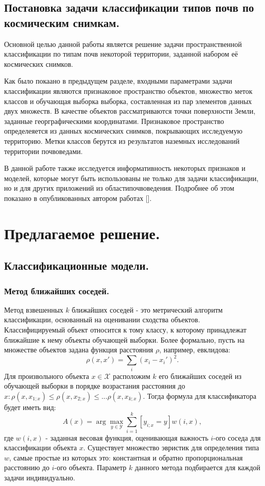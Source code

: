 \documentclass[12pt]{article}
\begin{document}
\subsection{Постановка задачи классификации типов почв по космическим снимкам.}

\par
Основной целью данной работы является решение задачи пространственной классификации
по типам почв некоторой территории, заданной набором её космических снимков.
\par
Как было покаано в предыдущем разделе, входными параметрами задачи классификации являются
признаковое пространство объектов, множество меток классов и обучающая выборка выборка,
составленная из пар элементов данных двух множеств. В качестве объектов рассматриваются точки
поверхности Земли, заданные георграфическими координатами. Признаковое пространство определеяется
из данных космических снимков, покрывающих исследуемую территорию. Метки классов берутся
из результатов наземных исследований территории почвоведами.
\par
В данной работе также исследуется информативность некоторых признаков и моделей, 
которые могут быть использованы не только для задачи классификации, 
но и для других приложений из областипочвоведения. 
Подробнее об этом показано в опубликованных автором работах {\color{red}[]}.

\section{Предлагаемое решение.}


\subsection{Классификационные модели.}


\subsubsection{Метод ближайших соседей.}

\par
Метод взвешенных $k$ ближайших соседей - это метрический алгоритм классификации,
основанный на оценивании сходства объектов. Классифицируемый объект относится к тому классу,
к которому принадлежат ближайшие к нему объекты обучающей выборки. Более формально,
пусть на множестве объектов задана функция расстояния $\rho$, например, евклидова:
\[
    \rho(x, x') = \sum_i (x_i - x_i')^2.
\]
Для произвольного объекта $x \in \mathcal{X}$ расположим $k$ его ближайших соседей
из обучающей выборки в порядке возрастания расстояния до 
$x: \rho(x, x_{1;x}) \le \rho(x, x_{2;x}) \le ... \rho(x, x_{k;x})$.
Тогда формула для классификатора будет иметь вид:
\[
    A(x)=\arg\max_{y\in\mathcal{Y}} \sum_{i=1}^k[y_{i;x}=y]w(i, x),
\]
где $w(i, x)$ - заданная весовая функция, оценивающая важность $i$-ого соседа для
классификации объекта $x$. Существует множество эвристик для определения типа $w$,
самые простые из которых это: константная и обратно пропорциональная расстоянию до $i$-ого
объекта. Параметр $k$ данного метода подбирается для каждой задачи индивидуально.
\end{document}
